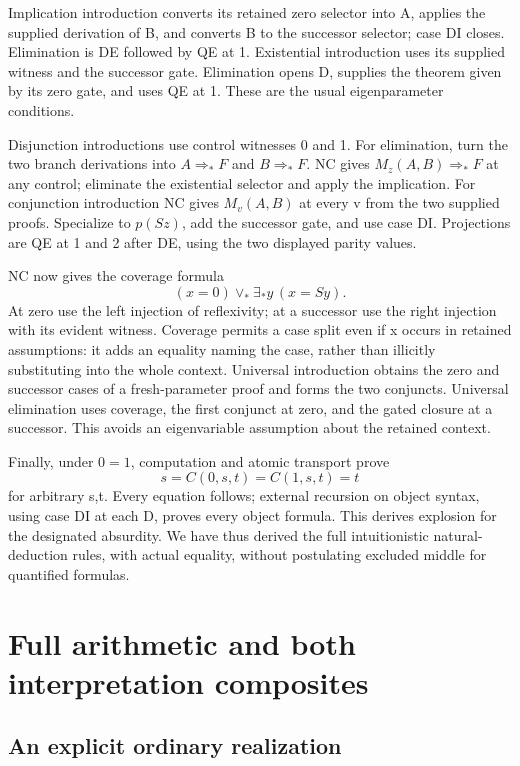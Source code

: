 \documentclass[11pt,letterpaper]{article}
\theoremstyle{definition}\newtheorem{definition}[theorem]{Definition}
\theoremstyle{remark}\newtheorem{remark}[theorem]{Remark}
\begin{document}
Implication introduction converts its retained zero selector into A,
applies the supplied derivation of B, and converts B to the successor
selector; case DI closes. Elimination is DE followed by QE at 1.
Existential introduction uses its supplied witness and the successor
gate. Elimination opens D, supplies the theorem given by its zero gate,
and uses QE at 1. These are the usual eigenparameter conditions.

Disjunction introductions use control witnesses 0 and 1. For elimination,
turn the two branch derivations into $A\Rightarrow_*F$ and
$B\Rightarrow_*F$. NC gives $M_z(A,B)\Rightarrow_*F$ at any control;
eliminate the existential selector and apply the implication.
For conjunction introduction NC gives $M_v(A,B)$ at every v from the
two supplied proofs. Specialize to $p(Sz)$, add the successor gate,
and use case DI. Projections are QE at 1 and 2 after DE, using the two
displayed parity values.

NC now gives the coverage formula
\[
             (x=0)\vee_*\exists_*y\,(x=Sy).
\]
At zero use the left injection of reflexivity; at a successor use the
right injection with its evident witness. Coverage permits a case split
even if x occurs in retained assumptions: it adds an equality naming
the case, rather than illicitly substituting into the whole context.
Universal introduction obtains the zero and successor cases of a
fresh-parameter proof and forms the two conjuncts. Universal elimination
uses coverage, the first conjunct at zero, and the gated closure at a
successor. This avoids an eigenvariable assumption about the retained context.

Finally, under $0=1$, computation and atomic transport prove
\[
                   s=C(0,s,t)=C(1,s,t)=t
\]
for arbitrary s,t. Every equation follows; external recursion on object
syntax, using case DI at each D, proves every object formula. This
derives explosion for the designated absurdity. We have thus derived
the full intuitionistic natural-deduction rules, with actual equality,
without postulating excluded middle for quantified formulas.

\section{Full arithmetic and both interpretation composites}
\label{sec:interpretations}

\subsection{An explicit ordinary realization}
\end{document}
